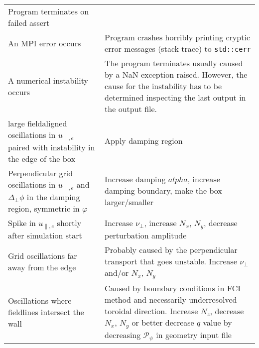 \begin{longtable}{p{6cm}p{8cm}}
Program terminates on failed assert
    \\
An MPI error occurs
&
Program crashes horribly printing cryptic error messages (stack trace) to \texttt{std::cerr}
    \\
A numerical instability occurs
&
The program terminates usually caused by a NaN exception raised. However,
the cause for the instability has to be determined inspecting the
last output in the output file.
    \\
\qquad large fieldaligned oscillations in $u_{\parallel,e}$ paired with instability in the edge of the box
&
Apply damping region
    \\
\qquad Perpendicular grid oscillations in $u_{\parallel,e}$ and $\Delta_\perp \phi$ in the damping region, symmetric in $\varphi$
&
Increase damping $alpha$, increase damping boundary, make the box larger/smaller
    \\
\qquad Spike in $u_{\parallel,e}$ shortly after simulation start
&
Increase $\nu_\perp$, increase $N_x$, $N_y$, decrease perturbation amplitude
    \\
\qquad Grid oscillations far away from the edge
&
Probably caused by the perpendicular transport that goes unstable. Increase $\nu_\perp$ and/or $N_x$, $N_y$
\\
\qquad Oscillations where fieldlines intersect the wall
&
Caused by boundary conditions in FCI method and necessarily underresolved toroidal direction. Increase $N_z$, decrease $N_x$, $N_y$ or better decrease $q$ value by decreasing $\mathcal P_\psi$ in geometry input file
\\
\bottomrule
\end{longtable}






